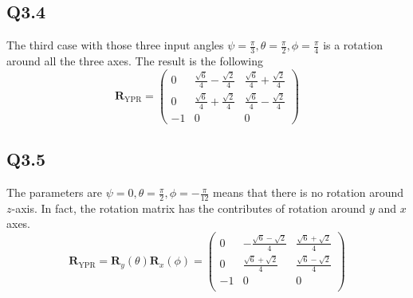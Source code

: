 \subsection{Q3.4}
The third case with those three input angles $\psi = \frac{\pi}{3}, \theta = \frac{\pi}{2}, \phi = \frac{\pi}{4}$ is a rotation around all the three axes. The result is the following
\begin{equation*}
	\mathbf{R}_\text{YPR} = \begin{pmatrix}
	 0& \frac{\sqrt{6}}{4} -\frac{\sqrt{2}}{4} & \frac{\sqrt{6}}{4} + \frac{\sqrt{2}}{4}\\
	0 & \frac{\sqrt{6}}{4} + \frac{\sqrt{2}}{4} & \frac{\sqrt{6}}{4} -\frac{\sqrt{2}}{4}  \\
	-1 & 0 & 0
	\end{pmatrix} 
\end{equation*}
\subsection{Q3.5}
The parameters are $\psi = 0, \theta = \frac{\pi}{2}, \phi = -\frac{\pi}{12}$ means that there is no rotation around $z$-axis. In fact, the rotation matrix has the contributes of rotation around $y$ and $x$ axes.
\begin{equation*}
	\mathbf{R}_\text{YPR} = \mathbf{R}_y(\theta)\mathbf{R}_x(\phi) 
	= \begin{pmatrix}
	0 & -\frac{\sqrt{6} - \sqrt{2}}{4} & \frac{\sqrt{6} + \sqrt{2}}{4} \\ 0 & \frac{\sqrt{6} + \sqrt{2}}{4} & \frac{\sqrt{6} - \sqrt{2}}{4} \\ -1 & 0 & 0 \\ 
	\end{pmatrix} 
\end{equation*}
